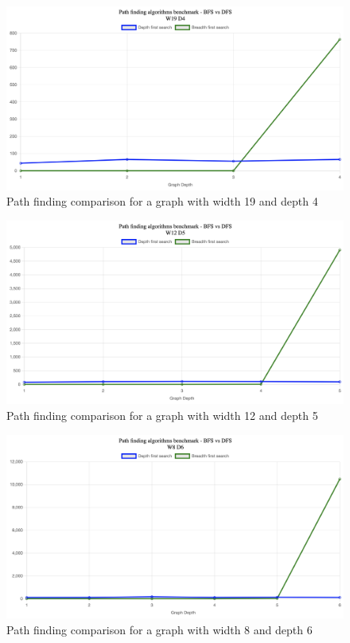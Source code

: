 \documentclass[12pt]{article}
\begin{document}
\begin{figure}[h]
    \centering
    \includegraphics[width=1\textwidth]{images/w19d4.png}
    \caption{Path finding comparison for a graph with width 19 and depth 4}
    \label{fig:w19d4}
\end{figure}

\begin{figure}[h]
    \centering
    \includegraphics[width=1\textwidth]{images/w12d5.png}
    \caption{Path finding comparison for a graph with width 12 and depth 5}
    \label{fig:w12d5}
\end{figure}

\begin{figure}[h]
    \centering
    \includegraphics[width=1\textwidth]{images/w8d6.png}
    \caption{Path finding comparison for a graph with width 8 and depth 6}
    \label{fig:w8d6}
\end{figure}
\end{document}

